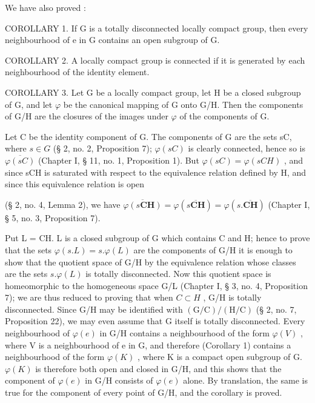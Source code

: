 We have also proved :

COROLLARY 1. If G is a totally disconnected locally compact group, then every neighbourhood of e in G contains an open subgroup of G.

COROLLARY 2. A locally compact group is connected if it is generated by each neighbourhood of the identity element.

COROLLARY 3. Let G be a locally compact group, let H be a closed subgroup of G, and let \(\varphi\) be the canonical mapping of G onto G/H. Then the components of G/H are the closures of the images under \(\varphi\) of the components of G.

Let C be the identity component of G. The components of G are the sets sC, where \(s \in G\) (§ 2, no. 2, Proposition 7); \(\varphi(sC)\) is clearly connected, hence so is \(\overline{\varphi(sC)}\) (Chapter I, § 11, no. 1, Proposition 1). But \(\varphi(sC) = \varphi(sCH)\) , and since sCH is saturated with respect to the equivalence relation defined by H, and since this equivalence relation is open

(§ 2, no. 4, Lemma 2), we have \(\overline{\varphi(s\mathbf{CH})} = \varphi(\overline{s\mathbf{CH}}) = \varphi(s.\overline{\mathbf{CH}})\) (Chapter I, § 5, no. 3, Proposition 7).

Put L = CH. L is a closed subgroup of G which contains C and H; hence to prove that the sets \(\varphi(s.L) = s.\varphi(L)\) are the components of G/H it is enough to show that the quotient space of G/H by the equivalence relation whose classes are the sets \(s.\varphi(L)\) is totally disconnected. Now this quotient space is homeomorphic to the homogeneous space G/L (Chapter I, § 3, no. 4, Proposition 7); we are thus reduced to proving that when \(C \subset H\) , G/H is totally disconnected. Since G/H may be identified with \((\mathrm{G/C})/(\mathrm{H/C})\) (§ 2, no. 7, Proposition 22), we may even assume that G itself is totally disconnected. Every neighbourhood of \(\varphi(e)\) in G/H contains a neighbourhood of the form \(\varphi(V)\) , where V is a neighbourhood of e in G, and therefore (Corollary 1) contains a neighbourhood of the form \(\varphi(K)\) , where K is a compact open subgroup of G. \(\varphi(K)\) is therefore both open and closed in G/H, and this shows that the component of \(\varphi(e)\) in G/H consists of \(\varphi(e)\) alone. By translation, the same is true for the component of every point of G/H, and the corollary is proved.

